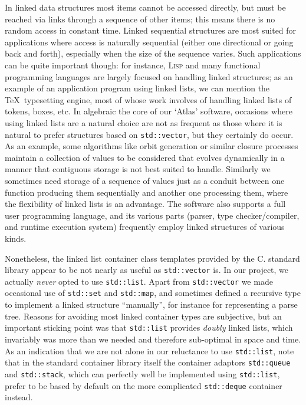 \documentclass[12pt]{article}
\theoremstyle{plain}
\theoremstyle{definition}
\def\PP{\copy\PPbox}
\newcommand\Cee{\textsc{C}}
\newcommand\Cpp{\Cee\PP}
\newcommand\std[1]{\texttt{std::#1}}
\def\vect.{\std{vector}}
\begin{document}
In linked data structures most items cannot be accessed directly, but must be
reached via links through a sequence of other items; this means there is no
random access in constant time. Linked sequential structures are most suited for
applications where access is naturally sequential (either one directional or
going back and forth), especially when the size of the sequence varies. Such
applications can be quite important though: for instance, \textsc{Lisp} and many
functional programming languages are largely focused on handling linked
structures; as an example of an application program using linked lists, we can
mention the \TeX\ typesetting engine, most of whose work involves of handling
linked lists of tokens, boxes, etc. In algebraic the core of our `Atlas'
software, occasions where using linked lists are a natural choice are not as
frequent as those where it is natural to prefer structures based on
\vect., but they certainly do occur. As an example, some algorithms like
orbit generation or similar closure processes maintain a collection of values to
be considered that evolves dynamically in a manner that contiguous storage is
not best suited to handle. Similarly we sometimes need storage of a sequence of
values just as a conduit between one function producing them sequentially and
another one processing them, where the flexibility of linked lists is an
advantage. The software also supports a full user programming language, and its
various parts (parser, type checker/compiler, and runtime execution system)
frequently employ linked structures of various kinds.

Nonetheless, the linked list container class templates provided by the \Cpp.
standard library appear to be not nearly as useful as \vect. is. In our
project, we actually \emph{never} opted to use \std{list}. Apart from
\vect. we made occasional use of \std{set} and \std{map}, and sometimes
defined a recursive type to implement a linked structure ``manually'', for
instance for representing a parse tree. Reasons for avoiding most linked
container types are subjective, but an important sticking point was that
\std{list} provides \emph{doubly} linked lists, which invariably was more than
we needed and therefore sub-optimal in space and time. As an indication that we
are not alone in our reluctance to use \std{list}, note that in the standard
container library itself the container adaptors \std{queue} and \std{stack},
which can perfectly well be implemented using \std{list}, prefer to be based by
default on the more complicated \std{deque} container instead.
\end{document}
